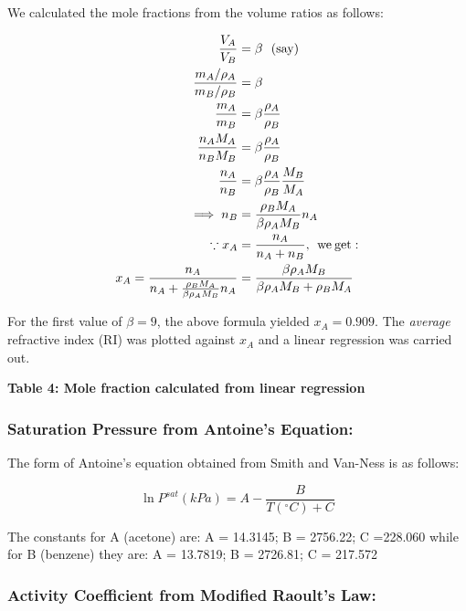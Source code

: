 \documentclass[11pt]{article}
\begin{document}
We calculated the mole fractions from the volume ratios as follows:

\begin{equation}
  \begin{split}
    \frac{V_A}{V_B}&=\beta \:\:\:(\rm say)\\
    \frac{m_A/\rho_A}{m_B/\rho_B}&=\beta\\
    \frac{m_A}{m_B}&=\beta\frac{\rho_A}{\rho_B}\\
    \frac{n_AM_A}{n_BM_B}&=\beta\frac{\rho_A}{\rho_B}\\
    \frac{n_A}{n_B}&=\beta\frac{\rho_A}{\rho_B}\frac{M_B}{M_A}\\
    \implies n_B&=\frac{\rho_BM_A}{\beta\rho_AM_B}n_A\\
    \because x_A&=\frac{n_A}{n_A+n_B},\:\:\rm we\: get:\\
    x_A = \frac{n_A}{n_A+\frac{\rho_BM_A}{\beta\rho_AM_B}n_A}&=\frac{\beta\rho_AM_B}{\beta\rho_AM_B+\rho_BM_A}
  \end{split}
\end{equation}

For the first value of \(\beta=9\), the above formula yielded
\(x_A=0.909\). The \emph{average} refractive index (RI) was plotted
against \(x_A\) and a linear regression was carried out.

\textbf{Table 4: Mole fraction calculated from linear regression}

\begin{center}
\end{center}

\hypertarget{saturation-pressure-from-antoines-equation}{%
  \subsubsection{Saturation Pressure from Antoine's
    Equation:}\label{saturation-pressure-from-antoines-equation}}

The form of Antoine's equation obtained from Smith and Van-Ness is as
follows:

\begin{equation}
  \ln{P^{sat}}(kPa)=A-\frac{B}{T(^{\circ}C)+C}
\end{equation}

The constants for A (acetone) are: A = 14.3145; B = 2756.22; C =228.060
while for B (benzene) they are: A = 13.7819; B = 2726.81; C = 217.572

\hypertarget{activity-coefficient-from-modified-raoults-law}{%
  \subsubsection{Activity Coefficient from Modified Raoult's
    Law:}\label{activity-coefficient-from-modified-raoults-law}}
\end{document}
